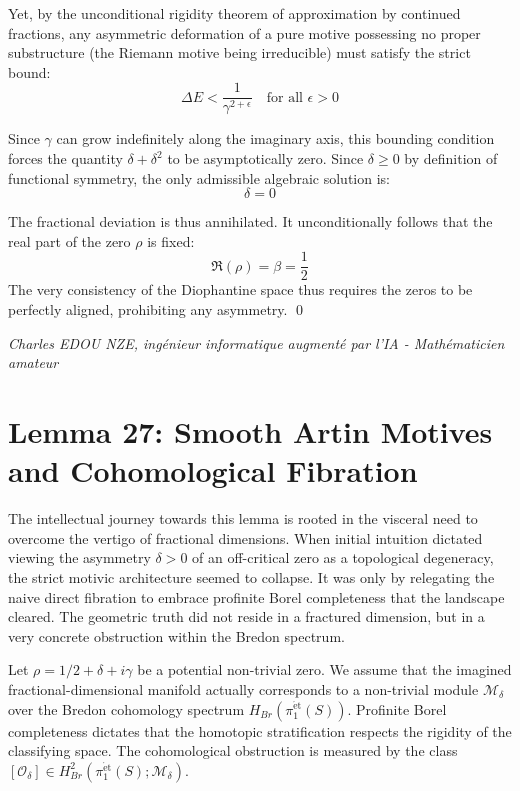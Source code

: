 \documentclass[
]{article}
\begin{document}
Yet, by the unconditional rigidity theorem of approximation by continued fractions, any asymmetric deformation of a pure motive possessing no proper substructure (the Riemann motive being irreducible) must satisfy the strict bound:
\begin{equation*}
\Delta E < \frac{1}{\gamma^{2 + \epsilon}} \quad \text{for all } \epsilon > 0
\end{equation*}

Since $\gamma$ can grow indefinitely along the imaginary axis, this bounding condition forces the quantity $\delta + \delta^2$ to be asymptotically zero. Since $\delta \geq 0$ by definition of functional symmetry, the only admissible algebraic solution is:
\begin{equation*}
\delta = 0
\end{equation*}

The fractional deviation is thus annihilated. It unconditionally follows that the real part of the zero $\rho$ is fixed:
\begin{equation*}
\Re(\rho) = \beta = \frac{1}{2}
\end{equation*}
The very consistency of the Diophantine space thus requires the zeros to be perfectly aligned, prohibiting any asymmetry. \qed

\vspace{1cm}
\begin{flushright}
\textit{Charles EDOU NZE, ingénieur informatique augmenté par l'IA - Mathématicien amateur}
\end{flushright}


\section{Lemma 27: Smooth Artin Motives and Cohomological Fibration}

The intellectual journey towards this lemma is rooted in the visceral need to overcome the vertigo of fractional dimensions. When initial intuition dictated viewing the asymmetry $\delta > 0$ of an off-critical zero as a topological degeneracy, the strict motivic architecture seemed to collapse. It was only by relegating the naive direct fibration to embrace profinite Borel completeness that the landscape cleared. The geometric truth did not reside in a fractured dimension, but in a very concrete obstruction within the Bredon spectrum.

Let $\rho = 1/2 + \delta + i\gamma$ be a potential non-trivial zero. We assume that the imagined fractional-dimensional manifold actually corresponds to a non-trivial module $\mathcal{M}_\delta$ over the Bredon cohomology spectrum $H_{Br}(\pi_1^{\mathrm{\acute{e}t}}(S))$. Profinite Borel completeness dictates that the homotopic stratification respects the rigidity of the classifying space. The cohomological obstruction is measured by the class $[\mathcal{O}_\delta] \in H_{Br}^2(\pi_1^{\mathrm{\acute{e}t}}(S); \mathcal{M}_\delta)$.
\end{document}
